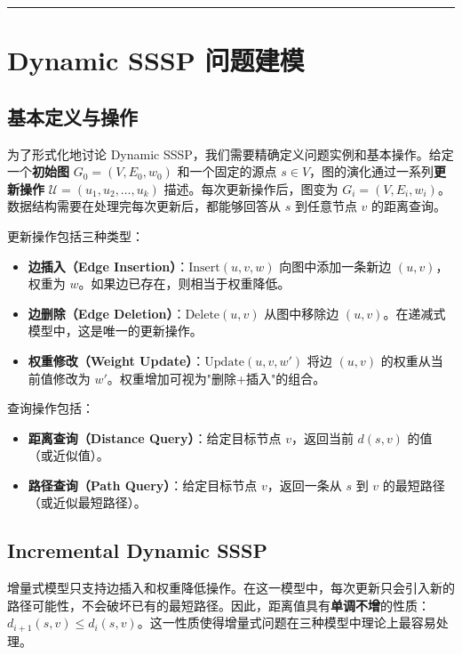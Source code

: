 \documentclass[12pt,a4paper]{ctexart}
\let\oldsection\section
\renewcommand{\section}{\clearpage\oldsection}
\begin{document}
\noindent\rule{\textwidth}{0.4pt}
\section{Dynamic SSSP 问题建模}

\subsection{基本定义与操作}

为了形式化地讨论 Dynamic SSSP，我们需要精确定义问题实例和基本操作。给定一个\textbf{初始图} $G_0=(V,E_0,w_0)$ 和一个固定的源点 $s\in V$，图的演化通过一系列\textbf{更新操作} $\mathcal{U}=(u_1,u_2,\ldots,u_k)$ 描述。每次更新操作后，图变为 $G_i=(V,E_i,w_i)$。数据结构需要在处理完每次更新后，都能够回答从 $s$ 到任意节点 $v$ 的距离查询。

更新操作包括三种类型：

\begin{itemize}
\item \textbf{边插入（Edge Insertion）}：$\text{Insert}(u,v,w)$ 向图中添加一条新边 $(u,v)$，权重为 $w$。如果边已存在，则相当于权重降低。
\item \textbf{边删除（Edge Deletion）}：$\text{Delete}(u,v)$ 从图中移除边 $(u,v)$。在递减式模型中，这是唯一的更新操作。
\item \textbf{权重修改（Weight Update）}：$\text{Update}(u,v,w')$ 将边 $(u,v)$ 的权重从当前值修改为 $w'$。权重增加可视为"删除+插入"的组合。

\end{itemize}
查询操作包括：

\begin{itemize}
\item \textbf{距离查询（Distance Query）}：给定目标节点 $v$，返回当前 $d(s,v)$ 的值（或近似值）。
\item \textbf{路径查询（Path Query）}：给定目标节点 $v$，返回一条从 $s$ 到 $v$ 的最短路径（或近似最短路径）。

\end{itemize}
\subsection{Incremental Dynamic SSSP}

增量式模型只支持边插入和权重降低操作。在这一模型中，每次更新只会引入新的路径可能性，不会破坏已有的最短路径。因此，距离值具有\textbf{单调不增}的性质：$d_{i+1}(s,v)\leq d_i(s,v)$。这一性质使得增量式问题在三种模型中理论上最容易处理。
\end{document}

